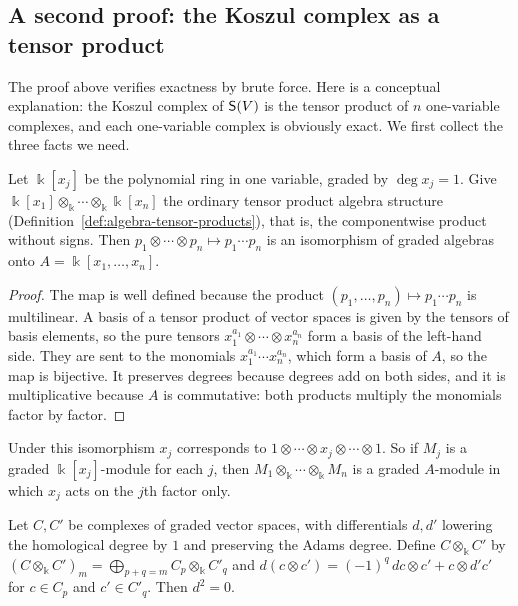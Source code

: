 \begin{advanced}
\subsection*{A second proof: the Koszul complex as a tensor product}

The proof above verifies exactness by brute force.
Here is a conceptual explanation: the Koszul complex of $\mathsf{S}(V)$ is the tensor product of $n$ one-variable complexes, and each one-variable complex is obviously exact.
We first collect the three facts we need.

\begin{lemma}\label{lem:poly-tensor}
Let $\Bbbk[x_j]$ be the polynomial ring in one variable, graded by $\deg x_j=1$.
Give $\Bbbk[x_1]\otimes_\Bbbk\cdots\otimes_\Bbbk\Bbbk[x_n]$ the ordinary tensor product algebra structure (Definition~\ref{def:algebra-tensor-products}), that is, the componentwise product without signs.
Then $p_1\otimes\cdots\otimes p_n\mapsto p_1\cdots p_n$ is an isomorphism of graded algebras onto $A=\Bbbk[x_1,\ldots,x_n]$.
\end{lemma}

\begin{proof}
The map is well defined because the product $(p_1,\ldots,p_n)\mapsto p_1\cdots p_n$ is multilinear.
A basis of a tensor product of vector spaces is given by the tensors of basis elements, so the pure tensors $x_1^{a_1}\otimes\cdots\otimes x_n^{a_n}$ form a basis of the left-hand side.
They are sent to the monomials $x_1^{a_1}\cdots x_n^{a_n}$, which form a basis of $A$, so the map is bijective.
It preserves degrees because degrees add on both sides, and it is multiplicative because $A$ is commutative: both products multiply the monomials factor by factor.
\end{proof}

Under this isomorphism $x_j$ corresponds to $1\otimes\cdots\otimes x_j\otimes\cdots\otimes1$.
So if $M_j$ is a graded $\Bbbk[x_j]$-module for each $j$, then $M_1\otimes_\Bbbk\cdots\otimes_\Bbbk M_n$ is a graded $A$-module in which $x_j$ acts on the $j$th factor only.

\begin{lemma}\label{lem:tensor-complexes}
Let $C,C'$ be complexes of graded vector spaces, with differentials $d,d'$ lowering the homological degree by $1$ and preserving the Adams degree.
Define $C\otimes_\Bbbk C'$ by $(C\otimes_\Bbbk C')_m=\bigoplus_{p+q=m}C_p\otimes_\Bbbk C'_q$ and
$d(c\otimes c')=(-1)^q\,dc\otimes c'+c\otimes d'c'$ for $c\in C_p$ and $c'\in C'_q$.
Then $d^2=0$.
\end{lemma}


\end{advanced}
